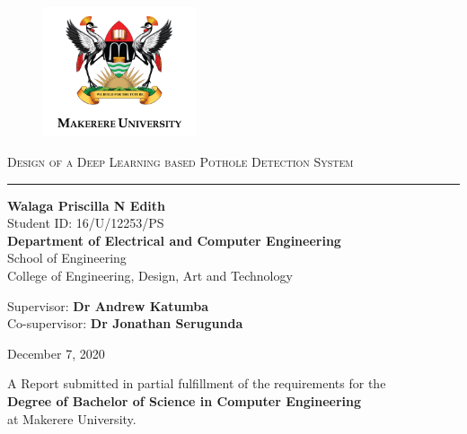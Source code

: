 \documentclass[12pt]{report}
\begin{document}
\begin{titlepage}
\centering

\begin{figure}[H]
\centering
\includegraphics[width=0.4\textwidth]{MAK_Logo2_png.png}%
\end{figure}


\textsc{}


{\huge \textsc{Design of a Deep Learning based Pothole Detection System}  \\}
\rule{3in}{0.4pt}


{\Large\textbf{Walaga Priscilla N Edith}	 \\}
Student ID: 16/U/12253/PS\\ \vspace{2cm}
{\large \textbf{Department of Electrical and Computer Engineering} \\
School of Engineering \\
College of Engineering, Design, Art and Technology}




{
Supervisor: \textbf{Dr Andrew Katumba}    \\
Co-supervisor: \textbf{Dr Jonathan Serugunda} }


December 7, 2020


{
A Report submitted in partial fulfillment of the requirements for the \\ \textbf{ Degree of Bachelor of Science in Computer Engineering} \\ at Makerere University. }


\end{titlepage}
\end{document}

